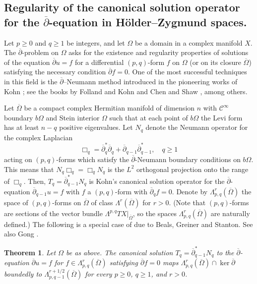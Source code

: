 \documentclass[11pt]{amsart}
\numberwithin{equation}{section}
\newtheorem{theorem}{Theorem}[section]
\theoremstyle{definition}
\newcommand\Cscr{\mathscr{C}}
\newcommand\dibar{\overline\partial}
\begin{document}
%
%
\subsection{Regularity of the canonical solution operator for the
$\dibar$-equation in H\"older--Zygmund spaces.}

Let $p\ge 0$ and $q\ge 1$ be integers, and
let $\Omega$ be a domain in a complex manifold $X$. 
The $\dibar$-problem on $\Omega$ asks for the existence 
and regularity properties of solutions of the equation 
$\dibar u=f$ for a differential $(p,q)$-form $f$ on $\Omega$
(or on its closure $\overline\Omega$) 
satisfying the necessary condition $\dibar f=0$. One of the
most successful techniques in this field is the $\dibar$--Neumann
method introduced in the pioneering works of Kohn \cite{Kohn1963,Kohn1964}; 
see the books by Folland and Kohn \cite{FollandKohn1972} and 
Chen and Shaw \cite{ChenShaw2001}, among others.

Let $\overline\Omega$ be a compact complex 
Hermitian manifold of dimension $n$ with $\Cscr^\infty$
boundary $b\Omega$ and Stein interior $\Omega$
such that at each point of $b\Omega$ the Levi form 
has at least $n-q$ positive eigenvalues. Let $N_q$ denote the 
Neumann operator for the complex Laplacian
\[
	\Box_q = \dibar^*_q\dibar_{q} +  \dibar_{q-1} \dibar^*_{q-1},
	\quad q\ge 1
\]
acting on $(p,q)$-forms which satisfy the $\dibar$-Neumann boundary conditions on $b\Omega$. This means that 
$N_q\Box_q = \Box_q N_q$ is the $L^2$ orthogonal projection onto 
the range of $\Box_q$. Then, $T_q= \dibar^*_{q-1}N_q$ is 
Kohn's canonical solution operator for the $\dibar$-equation 
$\dibar_{q-1}u = f$ with $f$ a $(p,q)$-form with $\dibar_q f=0$.
Denote by $\Lambda^r_{p,q}(\overline \Omega)$ the space
of $(p,q)$-forms on $\overline\Omega$ of class 
$\Lambda^r(\overline \Omega)$ for $r>0$. 
(Note that $(p,q)$-forms are sections of the vector bundle 
$\Lambda^{p,q}TX|_{\overline \Omega}$, so the spaces 
$\Lambda^r_{p,q}(\overline \Omega)$ are naturally defined.)
The following is a special case of 
\cite[Theorem 2]{BealsGreinerStanton1987} 
due to Beals, Greiner and Stanton.
See also Gong \cite{Gong2025TAMS}.

\begin{theorem}\label{th:dibar}
Let $\Omega$ be as above.
The canonical solution $T_q=\dibar_{q-1}^*N_q$ to the $\dibar$-equation 
$\dibar u=f$ for $f\in \Lambda^r_{p,q}(\overline \Omega)$ satisfying 
$\dibar f=0$ maps $\Lambda^r_{p,q}(\overline \Omega)\cap\ker \dibar$
boundedly to $\Lambda^{r+1/2}_{p,q-1}(\overline \Omega)$ 
for every $p\ge 0$, $q\ge 1$, and $r>0$. 
\end{theorem}
\end{document}

